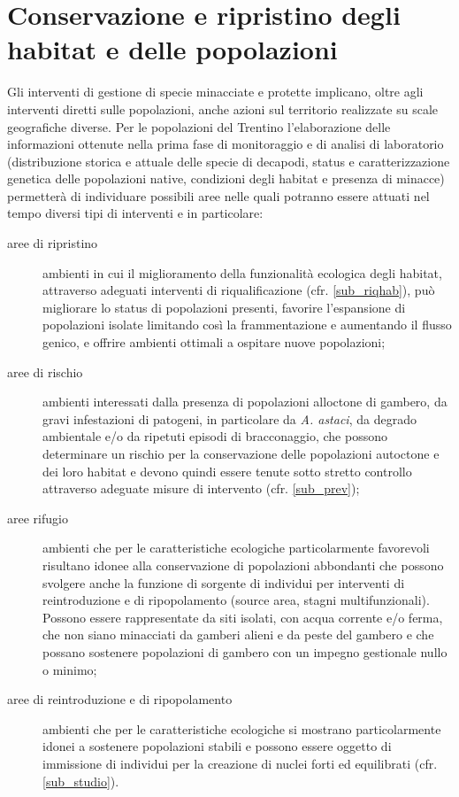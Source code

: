 \documentclass[11pt,a4paper,italian,twoside,openany]{memoir}
\begin{document}
\section{Conservazione e ripristino degli habitat e delle popolazioni}
Gli interventi di gestione di specie minacciate e protette implicano, oltre agli interventi diretti sulle popolazioni, anche azioni sul territorio realizzate su scale geografiche diverse. Per le popolazioni del Trentino l'elaborazione delle informazioni ottenute nella prima fase di monitoraggio e di analisi di laboratorio (distribuzione storica e attuale delle specie di decapodi, status e caratterizzazione genetica delle popolazioni native, condizioni degli habitat e presenza di minacce) permetterà di individuare possibili aree nelle quali potranno essere attuati nel tempo diversi tipi di interventi e in particolare:
\begin{description}
  \item[aree di ripristino] ambienti in cui il miglioramento della funzionalità ecologica degli habitat, attraverso adeguati interventi di riqualificazione (cfr. \ref{sub_riqhab}), può migliorare lo status di popolazioni presenti, favorire l'espansione di popolazioni isolate limitando così la frammentazione e aumentando il flusso genico, e offrire ambienti ottimali a ospitare nuove popolazioni; 
  \item[aree di rischio] ambienti interessati dalla presenza di popolazioni alloctone di gambero, da gravi infestazioni di patogeni, in particolare da \emph{A. astaci}, da degrado ambientale e/o da ripetuti episodi di bracconaggio, che possono determinare un rischio per la conservazione delle popolazioni autoctone e dei loro habitat e devono quindi essere tenute sotto stretto controllo attraverso adeguate misure di intervento (cfr. \ref{sub_prev}); 
  \item[aree rifugio] ambienti che per le caratteristiche ecologiche particolarmente favorevoli risultano idonee alla conservazione di popolazioni abbondanti che possono svolgere anche la funzione di sorgente di individui per interventi di reintroduzione e di ripopolamento (source area, stagni multifunzionali). Possono essere rappresentate da siti isolati, con acqua corrente e/o ferma, che non siano minacciati da gamberi alieni e da peste del gambero e che possano sostenere popolazioni di gambero con un impegno gestionale nullo o minimo; 
  \item[aree di reintroduzione e di ripopolamento] ambienti che per le caratteristiche ecologiche si mostrano particolarmente idonei a sostenere popolazioni stabili e possono essere oggetto di immissione di individui per la creazione di nuclei forti ed equilibrati (cfr. \ref{sub_studio}).
\end{description}
\end{document}
